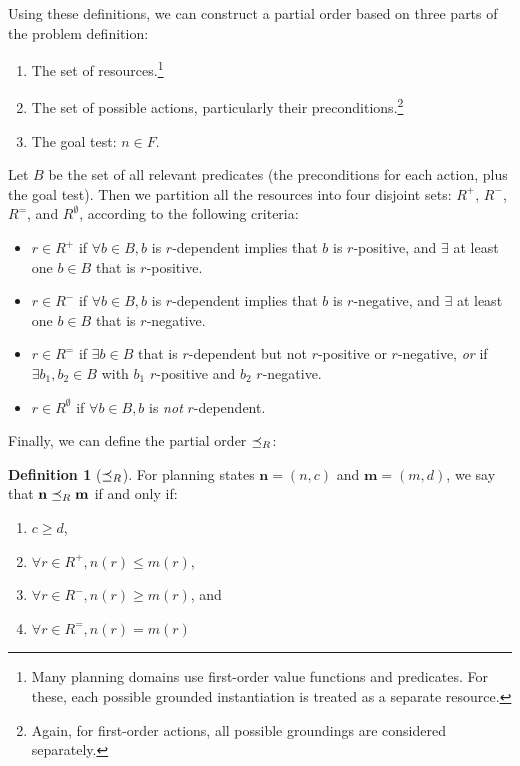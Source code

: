 \documentclass[letterpaper]{article}
\theoremstyle{plain} \newtheorem{theorem}{Theorem} \newtheorem{proposition}{Proposition} \newtheorem{lemma}{Lemma}
\theoremstyle{definition} \newtheorem{definition}{Definition} \newtheorem{conjecture}{Conjecture} \newtheorem*{example}{Example}
\theoremstyle{remark} \newtheorem*{remark}{Remark} \newtheorem*{note}{Note} \newtheorem{case}{Case}
\begin{document}
Using these definitions, we can construct a partial order based on three parts of the problem definition:
\begin{enumerate}
	\item The set of resources.\footnote{Many planning domains use first-order value functions and predicates. For these, each possible grounded instantiation is treated as a separate resource.}
	\item The set of possible actions, particularly their preconditions.\footnote{Again, for first-order actions, all possible groundings are considered separately.}
	\item The goal test: $n \in F$.
\end{enumerate}

Let $B$ be the set of all relevant predicates (the preconditions for each action, plus the goal test). Then we partition all the resources into four disjoint sets: $R^+$, $R^-$, $R^=$, and $R^\emptyset$, according to the following criteria:
\begin{itemize}
	\item $r \in R^+$ if $\forall b \in B, b$ is $r$-dependent implies that $b$ is $r$-positive, and $\exists$ at least one $b \in B$ that is $r$-positive.
	\item $r \in R^-$ if $\forall b \in B, b$ is $r$-dependent implies that $b$ is $r$-negative, and $\exists$ at least one $b \in B$ that is $r$-negative.
	\item $r \in R^=$ if $\exists b \in B$ that is $r$-dependent but not $r$-positive or $r$-negative, \emph{or} if $\exists b_1, b_2 \in B$ with $b_1$ $r$-positive and $b_2$ $r$-negative.
	\item $r \in R^\emptyset$ if $\forall b \in B, b$ is \emph{not} $r$-dependent.
\end{itemize}

Finally, we can define the partial order $\preceq_R$:
\begin{definition}[$\preceq_R$]
	\label{def-po}
	For planning states $\mathbf{n} = (n, c)$ and $\mathbf{m} = (m, d)$, we say that $\mathbf{n} \preceq_R \mathbf{m}$ if and only if:
	\begin{enumerate}
		\item $c \ge d$,
		\item $\forall r \in R^+, n(r) \le m(r)$,
		\item $\forall r \in R^-, n(r) \ge m(r)$, and
		\item $\forall r \in R^=, n(r) = m(r)$
	\end{enumerate}
\end{definition}
\end{document}
